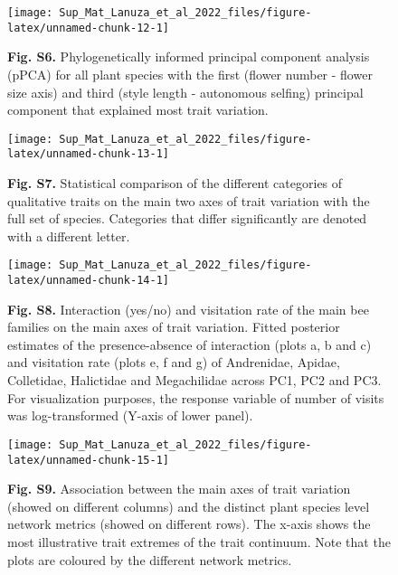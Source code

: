 \documentclass[
  12pt,
]{article}
\begin{document}
\newpage

\begin{figure}[h]
\texttt{[image: Sup\_Mat\_Lanuza\_et\_al\_2022\_files/figure-latex/unnamed-chunk-12-1]} \caption{\textbf{Fig. S6.} Phylogenetically informed principal component analysis (pPCA) for all plant species with the first (flower number - flower size axis) and third (style length - autonomous selfing) principal component that explained most trait variation.}\label{fig:unnamed-chunk-12}
\end{figure}

\newpage
\thispagestyle{empty}

\begin{figure}[h]
\texttt{[image: Sup\_Mat\_Lanuza\_et\_al\_2022\_files/figure-latex/unnamed-chunk-13-1]} \caption{\textbf{Fig. S7.} Statistical comparison of the different categories of qualitative traits on the main two axes of trait variation with the full set of species. Categories that differ significantly are denoted with a different letter.}\label{fig:unnamed-chunk-13}
\end{figure}

\begin{landscape}

\begin{figure}[!H]
\texttt{[image: Sup\_Mat\_Lanuza\_et\_al\_2022\_files/figure-latex/unnamed-chunk-14-1]} \caption{\textbf{Fig. S8.} Interaction (yes/no) and visitation rate of the main bee families on the main axes of trait variation. Fitted posterior estimates of the presence-absence of interaction (plots a, b and c) and visitation rate (plots e, f and g) of Andrenidae, Apidae, Colletidae, Halictidae and Megachilidae across PC1, PC2 and PC3. For visualization purposes, the response variable of number of visits was log-transformed (Y-axis of lower panel).}\label{fig:unnamed-chunk-14}
\end{figure}

\end{landscape}

\begin{landscape}

\begin{figure}[h]
\texttt{[image: Sup\_Mat\_Lanuza\_et\_al\_2022\_files/figure-latex/unnamed-chunk-15-1]} \caption{\textbf{Fig. S9.} Association between the main axes of trait variation (showed on different columns) and the distinct plant species level network metrics (showed on different rows). The x-axis shows the most illustrative trait extremes of the trait continuum. Note that the plots are coloured by the different network metrics.}\label{fig:unnamed-chunk-15}
\end{figure}

\end{landscape}
\end{document}
